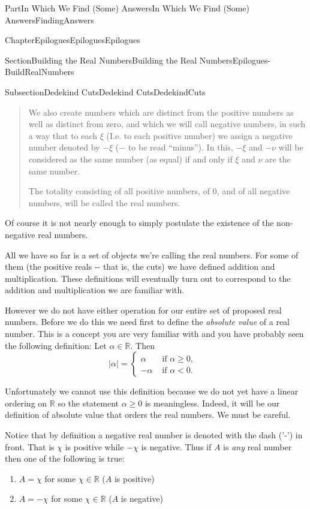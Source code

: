 \documentclass[oneside,10pt,]{book}
\numberwithin{equation}{part}
\newcommand{\abs}[1]{\left|#1\right|}
\newcommand{\RR}{\mathbb {R}}
\newcommand{\lt}{<}
\newcommand{\amp}{&}
\begin{document}
\begin{partptx}{Part}{In Which We Find (Some) Answers}{}{In Which We Find (Some) Answers}{}{}{FindingAnswers}
\begin{chapterptx}{Chapter}{Epilogues}{}{Epilogues}{}{}{Epilogues}
\begin{sectionptx}{Section}{Building the Real Numbers}{}{Building the Real Numbers}{}{}{Epilogues-BuildRealNumbers}
\begin{subsectionptx}{Subsection}{Dedekind Cuts}{}{Dedekind Cuts}{}{}{DedekindCuts}
\begin{quote}
We also create numbers which are distinct from the positive numbers as well as distinct from zero, and which we will call negative numbers, in such a way that to each \(\xi\) (I.e. to each positive number) we assign a negative number denoted by \(-\xi\) (\(-\) to be read ``minus''). In this, \(-\xi\) and \(-\nu\) will be considered as the same number (as equal) if and only if \(\xi\) and \(\nu\) are the same number.%
\par
The totality consisting of all positive numbers, of \(0\), and of all negative numbers, will be called the real numbers.%
\end{quote}
Of course it is not nearly enough to simply postulate the existence of the non-negative real numbers.%
\par
All we have so far is a set of objects we're calling the real numbers.  For some of them (the positive reals -{}-{} that is, the cuts) we have defined addition and multiplication. These definitions will eventually turn out to correspond to the addition and multiplication we are familiar with.%
\par
However we do not have either operation for our entire set of proposed real numbers.  Before we do this we need first to define the \emph{absolute value} of a real number. This is a concept you are very familiar with and you have probably seen the following definition: Let \(\alpha\in\RR\).  Then%
\begin{equation*}
\abs{\alpha} = \begin{cases}\alpha\amp  \text{ if \(\alpha\ge0,\) } \\ -\alpha\amp  \text{ if \(\alpha\lt 0.\) } \end{cases}
\end{equation*}
%
\par
Unfortunately we cannot use this definition because we do not yet have a linear ordering on \(\RR\) so the statement \(\alpha\ge0\) is meaningless.  Indeed, it will be our definition of absolute value that orders the real numbers.  We must be careful.%
\par
Notice that by definition a negative real number is denoted with the dash ('-') in front.  That is \(\chi\) is positive while \(-\chi\) is negative.  Thus if \(A\) is \emph{any} real number then one of the following is true:%
\begin{enumerate}
\item{}\(A=\chi\) for some \(\chi\in\RR\) (\(A\) is positive)%
\item{}\(A=-\chi\) for some \(\chi\in\RR\) (\(A\) is negative)%

\end{enumerate}
\end{subsectionptx}
\end{sectionptx}
\end{chapterptx}
\end{partptx}
\end{document}
